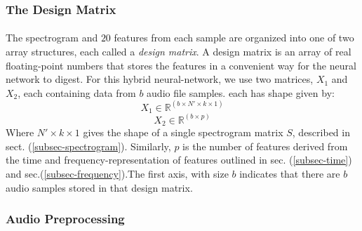 \documentclass[12pt,letterpaper]{article}
\begin{document}
\newpage


\subsubsection{The Design Matrix}

\paragraph*{}The spectrogram and $20$ features from each sample are organized into one of two array structures, each called a \textit{design matrix}. A design matrix is an array of real floating-point numbers that stores the features in a convenient way for the neural network to digest. For this hybrid neural-network, we use two matrices, $X_1$ and $X_2$, each containing data from $b$ audio file samples. each has shape given by:
\begin{equation}
\label{eqn-X1Shape}
X_1 \in \mathbb{R}^{(b \times N' \times k \times 1)}
\end{equation}
\begin{equation}
\label{eqn-X2Shape}
X_2 \in \mathbb{R}^{(b \times p)}
\end{equation}
Where $N' \times k \times 1$ gives the shape of a single spectrogram matrix $S$, described in sect. (\ref{subsec-spectrogram}). Similarly, $p$ is the number of features derived from the time and frequency-representation of features outlined in sec. (\ref{subsec-time}) and sec.(\ref{subsec-frequency}).The first axis, with size $b$ indicates that there are $b$ audio samples stored in that design matrix.


\subsubsection{Audio Preprocessing}
\label{subsubsec-Preprocessing}
\end{document}
